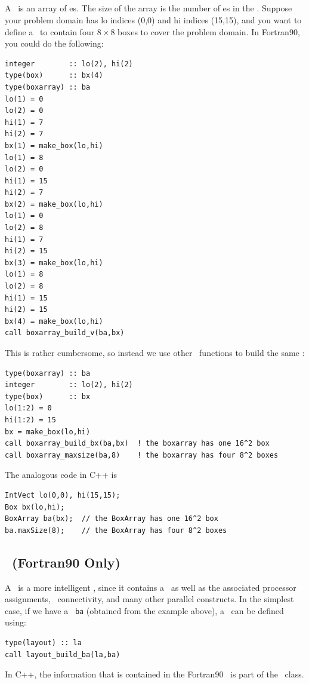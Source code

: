 \subsection{\BoxArray}

A \BoxArray\ is an array of \BoxType es.  The size of the array is the 
number of \BoxType es in the \BoxArray.  Suppose your problem domain
has lo indices (0,0) and hi indices (15,15), and you want to define
a \BoxArray\ to contain four $8\times 8$ boxes to cover the problem domain.
In Fortran90, you could do the following:
\begin{lstlisting}[backgroundcolor=\color{light-green}]
integer        :: lo(2), hi(2)
type(box)      :: bx(4)
type(boxarray) :: ba
lo(1) = 0
lo(2) = 0
hi(1) = 7
hi(2) = 7
bx(1) = make_box(lo,hi)
lo(1) = 8
lo(2) = 0
hi(1) = 15
hi(2) = 7
bx(2) = make_box(lo,hi)
lo(1) = 0
lo(2) = 8
hi(1) = 7
hi(2) = 15
bx(3) = make_box(lo,hi)
lo(1) = 8
lo(2) = 8
hi(1) = 15
hi(2) = 15
bx(4) = make_box(lo,hi)
call boxarray_build_v(ba,bx)
\end{lstlisting}
This is rather cumbersome, so instead we use other \BoxLib\ functions to
build the same \BoxArray:
\begin{lstlisting}[backgroundcolor=\color{light-green}]
type(boxarray) :: ba
integer        :: lo(2), hi(2)
type(box)      :: bx
lo(1:2) = 0
hi(1:2) = 15
bx = make_box(lo,hi)
call boxarray_build_bx(ba,bx)  ! the boxarray has one 16^2 box
call boxarray_maxsize(ba,8)    ! the boxarray has four 8^2 boxes
\end{lstlisting}
The analogous code in C++ is
\begin{lstlisting}[backgroundcolor=\color{light-blue}]
IntVect lo(0,0), hi(15,15);
Box bx(lo,hi);
BoxArray ba(bx);  // the BoxArray has one 16^2 box
ba.maxSize(8);    // the BoxArray has four 8^2 boxes
\end{lstlisting}

\subsection{\layout\ (Fortran90 Only)}

A \layout\ is a more intelligent \BoxArray, since it contains a \BoxArray\ as well
as the associated processor assignments, \BoxType\ connectivity, and many other
parallel constructs.  In the simplest case, if we have a \BoxArray\ {\tt ba} (obtained
from the example above), a 
\layout\ can be defined using:
\begin{lstlisting}[backgroundcolor=\color{light-green}]
type(layout) :: la
call layout_build_ba(la,ba)
\end{lstlisting}
In C++, the information that is contained in the Fortran90 \layout\ is part of
the \MultiFab\ class.

